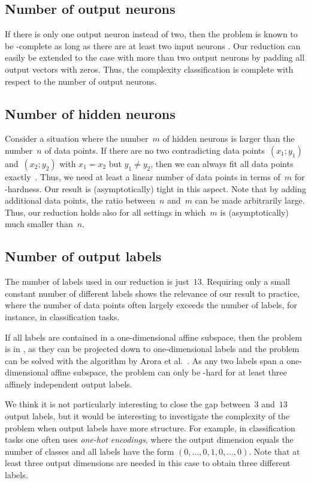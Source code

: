 \subsection{Number of output neurons}
If there is only one output neuron instead of two, then the problem is known to be \NP-complete
%
as long as there are at least two input neurons \cite{Arora2018_Understanding, Froese2023_FixedDimension}.
%
%
%
%
Our reduction can easily be extended to the case with more than two output neurons by padding all output vectors with zeros.
Thus, the complexity classification is complete with respect to the number of output neurons.

\subsection{Number of hidden neurons}
Consider a situation where the number~$m$ of hidden neurons is larger
than the number~$n$ of data points.
If there are no two contradicting data points~$(x_1; y_1)$ and~$(x_2; y_2)$ with $x_1 = x_2$ but $y_1 \neq y_2$, then we can always fit all data points exactly~\cite{Zhang2021_Understanding}.
Thus, we need at least a linear number of data points in terms of~$m$ for \ER-hardness.
Our result is (asymptotically) tight in this aspect.
Note that by adding additional data points, the ratio between~$n$ and~$m$ can be made arbitrarily large.
Thus, our reduction holds also for all settings in which~$m$ is (asymptotically) much smaller than~$n$.

\subsection{Number of output labels}
The number of labels used in our reduction is just~$13$.
Requiring only a small constant number of different labels shows the relevance of our result to practice, where the number of data points often largely exceeds the number of labels, for instance, in classification tasks.

If all labels are contained in a one-dimensional affine subspace, then the problem is in \NP, as they can be projected down to one-dimensional labels and the problem can be solved with the algorithm by Arora et al.~\cite{Arora2018_Understanding}.
As any two labels span a one-dimensional affine subspace, the problem can only be \ER-hard for at least three affinely independent output labels.

We think it is not particularly interesting to close the gap between~$3$ and~$13$ output labels, but it would be interesting to investigate the complexity of the problem when output labels have more structure.
For example, in classification tasks one often uses \emph{one-hot encodings}, where the output dimension equals the number of classes and all labels have the form $(0, \ldots, 0, 1, 0, \ldots, 0)$.
Note that at least three output dimensions are needed in this case to obtain three different labels.

